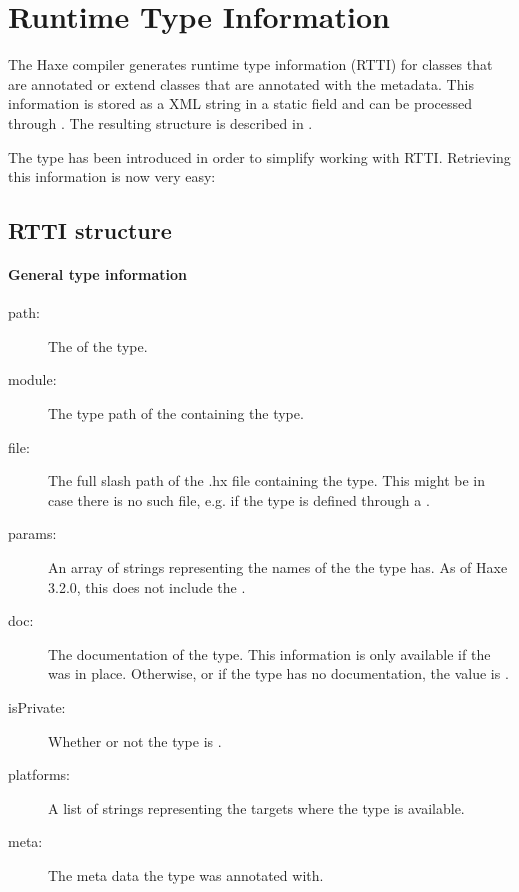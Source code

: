 \section{Runtime Type Information}
\label{cr-rtti}

The Haxe compiler generates runtime type information (RTTI) for classes that are annotated or extend classes that are annotated with the  metadata. This information is stored as a XML string in a static field  and can be processed through . The resulting structure is described in .


The type  has been introduced in order to simplify working with RTTI. Retrieving this information is now very easy:


\subsection{RTTI structure}
\label{cr-rtti-structure}

\paragraph{General type information}

\begin{description}
	\item[path:] The  of the type.
	\item[module:] The type path of the  containing the type.
	\item[file:] The full slash path of the .hx file containing the type. This might be  in case there is no such file, e.g. if the type is defined through a .
	\item[params:] An array of strings representing the names of the  the type has. As of Haxe 3.2.0, this does not include the .
	\item[doc:] The documentation of the type. This information is only available if the   was in place. Otherwise, or if the type has no documentation, the value is .
	\item[isPrivate:] Whether or not the type is .
	\item[platforms:] A list of strings representing the targets where the type is available.
	\item[meta:] The meta data the type was annotated with.
\end{description}
	
